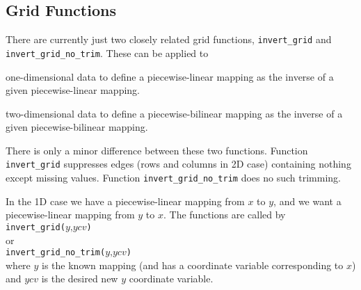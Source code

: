 \subsection{Grid Functions}
    \label{function-Grid}
    \label{function-Grid-Functions}

There are currently just two closely related grid functions, 
  \texttt{invert\_grid} and 
  \texttt{invert\_grid\_no\_trim}. These can be applied to
  \begin{bullets}
    \item one-dimensional data to define a piecewise-linear mapping as
    the inverse of a given piecewise-linear mapping.
    \item two-dimensional data to define a piecewise-bilinear mapping as
    the inverse of a given piecewise-bilinear mapping.
  \end{bullets}

There is only a minor difference between these two functions.
  Function 
  \texttt{invert\_grid} suppresses edges (rows and columns in 2D
  case) containing nothing except missing values. Function 
  \texttt{invert\_grid\_no\_trim} does no such trimming.
  \par In the 1D case we have a piecewise-linear mapping from 
  $x$ to 
  $y$, and we want a piecewise-linear mapping from 
  $y$ to 
  $x$.
The functions are called by
  \\
  \texttt{invert\_grid(}$y\texttt{,}ycv$\texttt{)}
  \\or
  \\
  \texttt{invert\_grid\_no\_trim(}$y\texttt{,}ycv$\texttt{)}
  \\where 
  $y$ is the known mapping (and has a coordinate variable corresponding to $x$)
  \\and 
  $ycv$ is the desired new $y$ coordinate variable.

